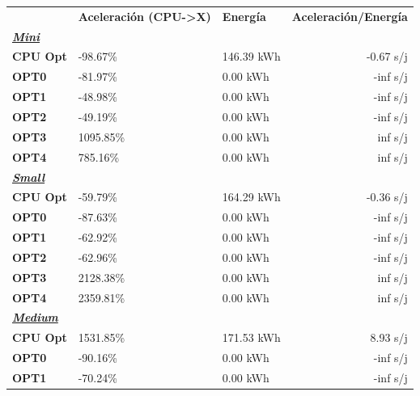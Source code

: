 \begin{table}[H]
    \centering
    \begin{tabular}{lllr}
    \rowcolor[HTML]{DAE8FC} \ & \textbf{Aceleración (CPU->X)} & \textbf{	Energía} & \textbf{	Aceleración/Energía} \\
    \cellcolor[HTML]{DAE8FC} \textbf{\textbf{{\emph{{\underline{{Mini}}}}}}} & &	&	 \\
    \rowcolor[HTML]{EFEFEF} \cellcolor[HTML]{DAE8FC} \textbf{CPU Opt} &-98.67\%  &	146.39 kWh  &	-0.67 s/j \\
    \cellcolor[HTML]{DAE8FC} \textbf{OPT0} & -81.97\%  &	0.00 kWh  &	-inf s/j \\
    \rowcolor[HTML]{EFEFEF} \cellcolor[HTML]{DAE8FC} \textbf{OPT1} &-48.98\%  &	0.00 kWh  &	-inf s/j \\
    \cellcolor[HTML]{DAE8FC} \textbf{OPT2} & -49.19\%  &	0.00 kWh  &	-inf s/j \\
    \rowcolor[HTML]{EFEFEF} \cellcolor[HTML]{DAE8FC} \textbf{OPT3} &1095.85\%  &	0.00 kWh  &	inf s/j \\
    \cellcolor[HTML]{DAE8FC} \textbf{OPT4} & 785.16\%  &	0.00 kWh  &	inf s/j \\
    \rowcolor[HTML]{EFEFEF} \cellcolor[HTML]{DAE8FC} \textbf{\textbf{{\emph{{\underline{{Small}}}}}}} &&	&	 \\
    \cellcolor[HTML]{DAE8FC} \textbf{CPU Opt} & -59.79\%  &	164.29 kWh  &	-0.36 s/j \\
    \rowcolor[HTML]{EFEFEF} \cellcolor[HTML]{DAE8FC} \textbf{OPT0} &-87.63\%  &	0.00 kWh  &	-inf s/j \\
    \cellcolor[HTML]{DAE8FC} \textbf{OPT1} & -62.92\%  &	0.00 kWh  &	-inf s/j \\
    \rowcolor[HTML]{EFEFEF} \cellcolor[HTML]{DAE8FC} \textbf{OPT2} &-62.96\%  &	0.00 kWh  &	-inf s/j \\
    \cellcolor[HTML]{DAE8FC} \textbf{OPT3} & 2128.38\%  &	0.00 kWh  &	inf s/j \\
    \rowcolor[HTML]{EFEFEF} \cellcolor[HTML]{DAE8FC} \textbf{OPT4} &2359.81\%  &	0.00 kWh  &	inf s/j \\
    \cellcolor[HTML]{DAE8FC} \textbf{\textbf{{\emph{{\underline{{Medium}}}}}}} & &	&	 \\
    \rowcolor[HTML]{EFEFEF} \cellcolor[HTML]{DAE8FC} \textbf{CPU Opt} &1531.85\%  &	171.53 kWh  &	8.93 s/j \\
    \cellcolor[HTML]{DAE8FC} \textbf{OPT0} & -90.16\%  &	0.00 kWh  &	-inf s/j \\
    \rowcolor[HTML]{EFEFEF} \cellcolor[HTML]{DAE8FC} \textbf{OPT1} &-70.24\%  &	0.00 kWh  &	-inf s/j \\

\end{tabular}
\end{table}

